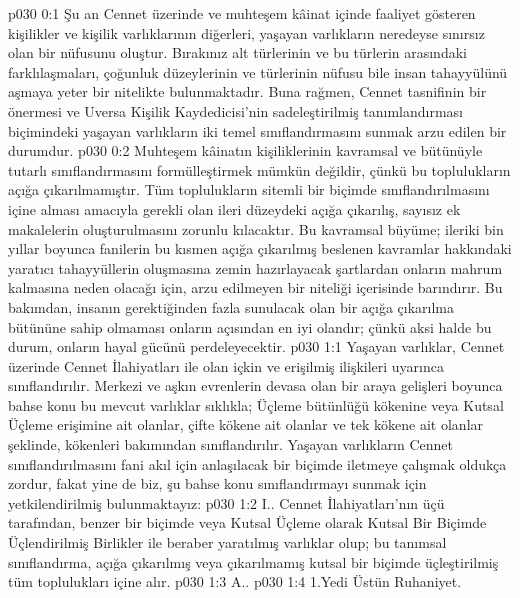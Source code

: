 \vs p030 0:1 Şu an Cennet üzerinde ve muhteşem kâinat içinde faaliyet gösteren kişilikler ve kişilik varlıklarının diğerleri, yaşayan varlıkların neredeyse sınırsız olan bir nüfusunu oluştur. Bırakınız alt türlerinin ve bu türlerin arasındaki farklılaşmaları, çoğunluk düzeylerinin ve türlerinin nüfusu bile insan tahayyülünü aşmaya yeter bir nitelikte bulunmaktadır. Buna rağmen, Cennet tasnifinin bir önermesi ve Uversa Kişilik Kaydedicisi’nin sadeleştirilmiş tanımlandırması biçimindeki yaşayan varlıkların iki temel sınıflandırmasını sunmak arzu edilen bir durumdur.
\vs p030 0:2 Muhteşem kâinatın kişiliklerinin kavramsal ve bütünüyle tutarlı sınıflandırmasını formülleştirmek mümkün değildir, çünkü bu toplulukların  açığa çıkarılmamıştır. Tüm toplulukların sitemli bir biçimde sınıflandırılmasını içine alması amacıyla gerekli olan ileri düzeydeki açığa çıkarılış, sayısız ek makalelerin oluşturulmasını zorunlu kılacaktır. Bu kavramsal büyüme; ileriki bin yıllar boyunca fanilerin bu kısmen açığa çıkarılmış beslenen kavramlar hakkındaki yaratıcı tahayyüllerin oluşmasına zemin hazırlayacak şartlardan onların mahrum kalmasına neden olacağı için, arzu edilmeyen bir niteliği içerisinde barındırır. Bu bakımdan, insanın gerektiğinden fazla sunulacak olan bir açığa çıkarılma bütününe sahip olmaması onların açısından en iyi olandır; çünkü aksi halde bu durum, onların hayal gücünü perdeleyecektir.
\vs p030 1:1 Yaşayan varlıklar, Cennet üzerinde Cennet İlahiyatları ile olan içkin ve erişilmiş ilişkileri uyarınca sınıflandırılır. Merkezi ve aşkın evrenlerin devasa olan bir araya gelişleri boyunca bahse konu bu mevcut varlıklar sıklıkla; Üçleme bütünlüğü kökenine veya Kutsal Üçleme erişimine ait olanlar, çifte kökene ait olanlar ve tek kökene ait olanlar şeklinde, kökenleri bakımından sınıflandırılır. Yaşayan varlıkların Cennet sınıflandırılmasını fani akıl için anlaşılacak bir biçimde iletmeye çalışmak oldukça zordur, fakat yine de biz, şu bahse konu sınıflandırmayı sunmak için yetkilendirilmiş bulunmaktayız:
\vs p030 1:2 I.\bibnobreakspace {}. Cennet İlahiyatları’nın üçü tarafından, benzer bir biçimde veya Kutsal Üçleme olarak Kutsal Bir Biçimde Üçlendirilmiş Birlikler ile beraber yaratılmış varlıklar olup; bu tanımsal sınıflandırma, açığa çıkarılmış veya çıkarılmamış kutsal bir biçimde üçleştirilmiş tüm toplulukları içine alır.
\vs p030 1:3 A.\bibnobreakspace {}.
\vs p030 1:4 1.\bibnobreakspace Yedi Üstün Ruhaniyet.
